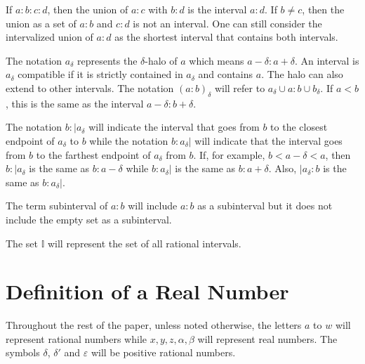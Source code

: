\documentclass[12pt]{article}
\begin{document}
If $a:b:c:d$, then the union of $a:c$ with $b:d$ is the interval $a:d$. If $b \neq c$, then the union as a set of $a:b$ and $c:d$ is not an interval. One can still consider the intervalized union of $a:d$ as the shortest interval that contains both intervals. 

The notation $a_\delta$ represents the $\delta$-halo of $a$ which means $a -\delta : a+ \delta$. An interval is $a_\delta$ compatible if it is strictly contained in $a_\delta$ and contains $a$. The halo can also extend to other intervals. The notation $(a:b)_\delta$ will refer to $a_\delta \cup a:b \cup b_\delta$. If $a <b$, this is the same as the interval $a-\delta:b+\delta$.

The notation $b : |a_\delta$ will indicate the interval that goes from $b$ to the closest endpoint of $a_\delta$ to $b$ while the notation $b:a_{\delta}|$ will indicate that the interval goes from $b$ to the farthest endpoint of $a_\delta$ from $b$. If, for example, $b < a-\delta < a$, then $b:|a_\delta$ is the same as $b:a-\delta$ while $b:a_{\delta}|$ is the same as $b:a+\delta$. Also, $|a_\delta : b$ is the same as $b:a_\delta |$.

The term subinterval of $a:b$ will include $a:b$ as a subinterval but it does not include the empty set as a subinterval.  

The set $\mathbb{I}$ will represent the set of all rational intervals. 

\section{Definition of a Real Number}

Throughout the rest of the paper, unless noted otherwise, the letters $a$ to $w$ will represent rational numbers while $x, y, z, \alpha, \beta$ will represent real numbers.  The symbols $\delta$, $\delta'$ and $\varepsilon$ will be positive rational numbers. 
\end{document}
